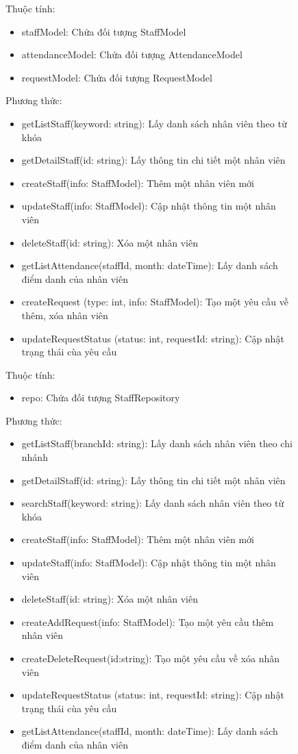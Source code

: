 \begin{figure}[!htp]
Thuộc tính:
\begin{itemize}
	\item staffModel: Chứa đối tượng StaffModel
	\item attendanceModel: Chứa đối tượng AttendanceModel
	\item requestModel: Chứa đối tượng RequestModel
\end{itemize}
Phương thức:
\begin{itemize}
	\item getListStaff(keyword: string): Lấy danh sách nhân viên theo từ khóa
	\item getDetailStaff(id: string): Lấy thông tin chi tiết một nhân viên
	\item createStaff(info: StaffModel): Thêm một nhân viên mới
	\item updateStaff(info: StaffModel): Cập nhật thông tin một nhân viên
	\item deleteStaff(id: string): Xóa một nhân viên
	\item getListAttendance(staffId, month: dateTime): Lấy danh sách điểm danh của nhân viên
	\item createRequest (type: int, info: StaffModel): Tạo một yêu cầu về thêm, xóa nhân viên
	\item updateRequestStatus (status: int, requestId: string): Cập nhật trạng thái cùa yêu cầu
\end{itemize}

Thuộc tính:
\begin{itemize}
	\item repo: Chứa đối tượng StaffRepository
\end{itemize}
Phương thức:
\begin{itemize}
	\item getListStaff(branchId: string): Lấy danh sách nhân viên theo chi nhánh
	\item getDetailStaff(id: string): Lấy thông tin chi tiết một nhân viên
	\item searchStaff(keyword: string): Lấy danh sách nhân viên theo từ khóa
	\item createStaff(info: StaffModel): Thêm một nhân viên mới
	\item updateStaff(info: StaffModel): Cập nhật thông tin một nhân viên
	\item deleteStaff(id: string): Xóa một nhân viên
	\item createAddRequest(info: StaffModel): Tạo một yêu cầu thêm nhân viên
	\item createDeleteRequest(id:string): Tạo một yêu cầu về xóa nhân viên
	\item updateRequestStatus (status: int, requestId: string): Cập nhật trạng thái cùa yêu cầu
	\item getListAttendance(staffId, month: dateTime): Lấy danh sách điểm danh của nhân viên
\end{itemize}


\end{figure}
